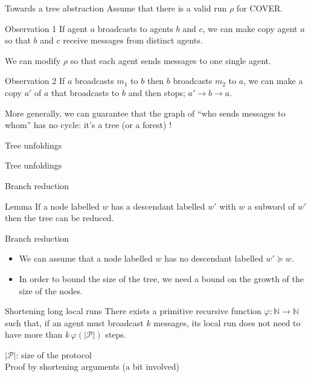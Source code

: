\documentclass{beamer}
\begin{document}
\begin{frame}
	\tableofcontents[currentsubsection]
\end{frame}

\begin{frame}{Towards a tree abstraction}
Assume that there is a valid run $\rho$ for COVER. 
\begin{block}{Observation 1}
If agent $a$ broadcasts to agents $b$ and $c$, we can make copy agent $a$ so that $b$ and $c$ receive messages from distinct agents. 
\end{block}
We can modify $\rho$ so that each agent sends messages to one single agent.
\pause

\begin{block}{Observation 2}
If $a$ broadcasts $m_1$ to $b$ then $b$ broadcasts $m_2$ to $a$, we can make a copy $a'$ of $a$ that broadcasts to $b$ and then stops; $a' \to b \to a$.
\end{block}
More generally, we can guarantee that the graph of ``who sends messages to whom'' has no cycle: it's a tree (or a forest) !
\end{frame}
	

\begin{frame}{Tree unfoldings}
	

	
	
\end{frame}

\begin{frame}{Tree unfoldings}
	
	
\end{frame}

\begin{frame}{Branch reduction}
	
	\begin{block}{Lemma}
		If a node labelled $w$ has a descendant labelled $w'$ with $w$ a subword of $w'$ then the tree can be reduced.
	\end{block}
	
	
\end{frame}

\begin{frame}{Branch reduction}
	\begin{itemize}
		\item We can assume that a node labelled $w$ has no descendant labelled $w' \succeq w$.
		\pause 
		\item In order to bound the size of the tree, we need a bound on the growth of the size of the nodes.
	\end{itemize}

	\pause

	\begin{block}{Shortening long local runs} There exists a primitive recursive function $\varphi: \mathbb{N} \rightarrow \mathbb{N}$ such that, if an agent must broadcast $k$ messages, its local run does not need to have more than $k \, \varphi(|\mathcal{P}|)$ steps. 
	\end{block}
	$|\mathcal{P}|$: size of the protocol \\
	Proof by shortening arguments (a bit involved)
\end{frame}
\end{document}
